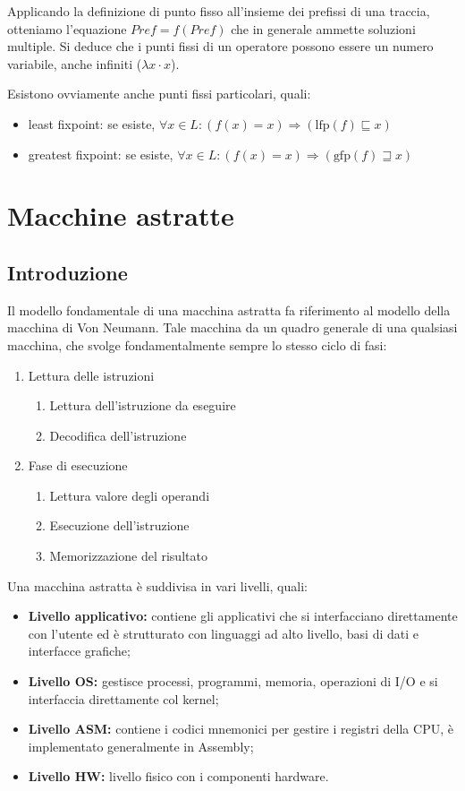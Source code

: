 \documentclass[a4paper, 10pt]{article}
\begin{document}
	Applicando la definizione di punto fisso all'insieme dei prefissi di una traccia, otteniamo l'equazione $Pref=f(Pref)$ che in generale ammette soluzioni multiple. Si deduce che i punti fissi di un operatore possono essere un numero variabile, anche infiniti ($\lambda x \cdot x$).
	
	Esistono ovviamente anche punti fissi particolari, quali:
	\begin{itemize}
		\item least fixpoint: se esiste, $\forall x \in L: (f(x)=x) \Rightarrow (\text{lfp}(f) \sqsubseteq x)$
		
		\item greatest fixpoint: se esiste, $\forall x \in L: (f(x)=x) \Rightarrow (\text{gfp}(f) \sqsupseteq x)$
	\end{itemize}
	
	
	\section{Macchine astratte}
	\subsection{Introduzione}
	Il modello fondamentale di una macchina astratta fa riferimento al modello della macchina di Von Neumann. Tale macchina da un quadro generale di una qualsiasi macchina, che svolge fondamentalmente sempre lo stesso ciclo di fasi:
	\begin{enumerate}
		\item Lettura delle istruzioni
		\begin{enumerate}
			\item Lettura dell'istruzione da eseguire
			\item Decodifica dell'istruzione
		\end{enumerate}
		\item Fase di esecuzione
		\begin{enumerate}
			\item Lettura valore degli operandi
			\item Esecuzione dell'istruzione
			\item Memorizzazione del risultato
		\end{enumerate}
	\end{enumerate}
	
	Una macchina astratta è suddivisa in vari livelli, quali:
	\begin{itemize}
		\item \textbf{Livello applicativo:} contiene gli applicativi che si interfacciano direttamente con l'utente ed è strutturato con linguaggi ad alto livello, basi di dati e interfacce grafiche;
		\item \textbf{Livello OS:} gestisce processi, programmi, memoria, operazioni di I/O e si interfaccia direttamente col kernel;
		\item \textbf{Livello ASM:} contiene i codici mnemonici per gestire i registri della CPU, è implementato generalmente in Assembly;
		\item \textbf{Livello HW:} livello fisico con i componenti hardware.
	\end{itemize}
	
\end{document}
